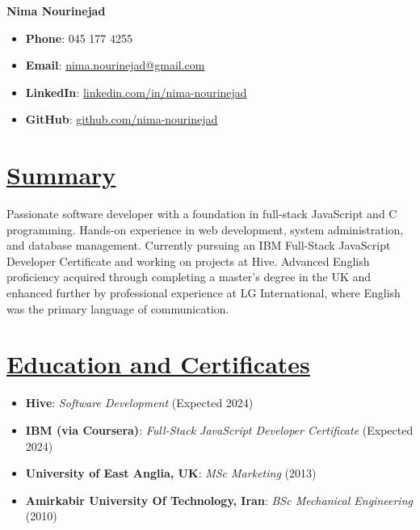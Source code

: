\documentclass[a4paper,9pt]{article}
\newcommand{\mainsection}[1]{\underline{#1}}
\begin{document}
\noindent
\begin{minipage}[t]{0.5\textwidth}
  \textbf{\huge Nima Nourinejad}
\end{minipage}%
\begin{minipage}[t]{0.5\textwidth}
  \raggedleft
  \begin{itemize}[label={},leftmargin=*,noitemsep]
    \item \textbf{Phone}: 045 177 4255
    \item \textbf{Email}: \href{mailto:nima.nourinejad@gmail.com}{nima.nourinejad@gmail.com}
    \item \textbf{LinkedIn}: \href{https://linkedin.com/in/nima-nourinejad}{linkedin.com/in/nima-nourinejad}
    \item \textbf{GitHub}: \href{https://github.com/nima-nourinejad}{github.com/nima-nourinejad}
  \end{itemize}
\end{minipage}

\section*{\mainsection{Summary}}
Passionate software developer with a foundation in full-stack JavaScript and C programming. Hands-on experience in web development, system administration, and database management. Currently pursuing an IBM Full-Stack JavaScript Developer Certificate and working on projects at Hive. Advanced English proficiency acquired through completing a master’s degree in the UK and enhanced further by professional experience at LG International, where English was the primary language of communication.

\section*{\mainsection{Education and Certificates}}
\begin{itemize}[leftmargin=*]
  \item \textbf{Hive}: \textit{Software Development} (Expected 2024)
  \item \textbf{IBM (via Coursera)}: \textit{Full-Stack JavaScript Developer Certificate} (Expected 2024)
  \item \textbf{University of East Anglia, UK}: \textit{MSc Marketing} (2013)
  \item \textbf{Amirkabir University Of Technology, Iran}: \textit{BSc Mechanical Engineering} (2010)
\end{itemize}
\end{document}
